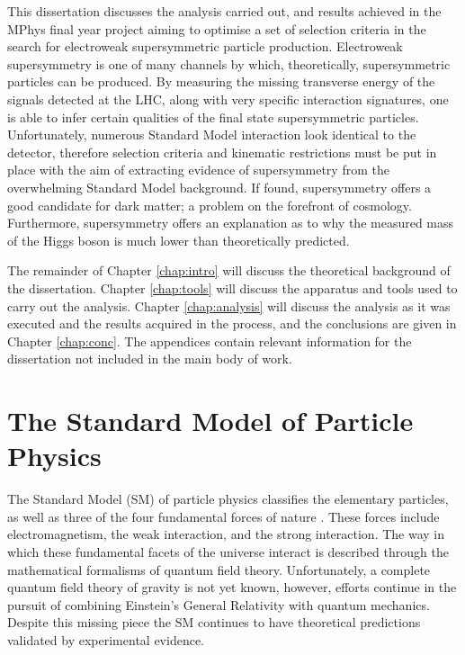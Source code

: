 This dissertation discusses the analysis carried out, and results achieved in the MPhys final year project aiming to optimise a set of selection criteria in the search for electroweak supersymmetric particle production.
Electroweak supersymmetry is one of many channels by which, theoretically, supersymmetric particles can be produced.
By measuring the missing transverse energy of the signals detected at the LHC, along with very specific interaction signatures, one is able to infer certain qualities of the final state supersymmetric particles.
Unfortunately, numerous Standard Model interaction look identical to the detector, therefore selection criteria and kinematic restrictions must be put in place with the aim of extracting evidence of supersymmetry from the overwhelming Standard Model background.
If found, supersymmetry offers a good candidate for dark matter; a problem on the forefront of cosmology.
Furthermore, supersymmetry offers an explanation as to why the measured mass of the Higgs boson is much lower than theoretically predicted.

The remainder of Chapter \ref{chap:intro} will discuss the theoretical background of the dissertation.
Chapter \ref{chap:tools} will discuss the apparatus and tools used to carry out the analysis.
Chapter \ref{chap:analysis} will discuss the analysis as it was executed and the results acquired in the process, and the conclusions are given in Chapter \ref{chap:conc}.
The appendices contain relevant information for the dissertation not included in the main body of work.


\section{The Standard Model of Particle Physics}
The Standard Model (SM) of particle physics classifies the elementary particles, as well as three of the four fundamental forces of nature \cite{oerter2006theory}. 
These forces include electromagnetism, the weak interaction, and the strong interaction.
The way in which these fundamental facets of the universe interact is described through the mathematical formalisms of quantum field theory.
Unfortunately, a complete quantum field theory of gravity is not yet known, however, efforts continue in the pursuit of combining Einstein's General Relativity with quantum mechanics.
Despite this missing piece the SM continues to have theoretical predictions validated by experimental evidence.

